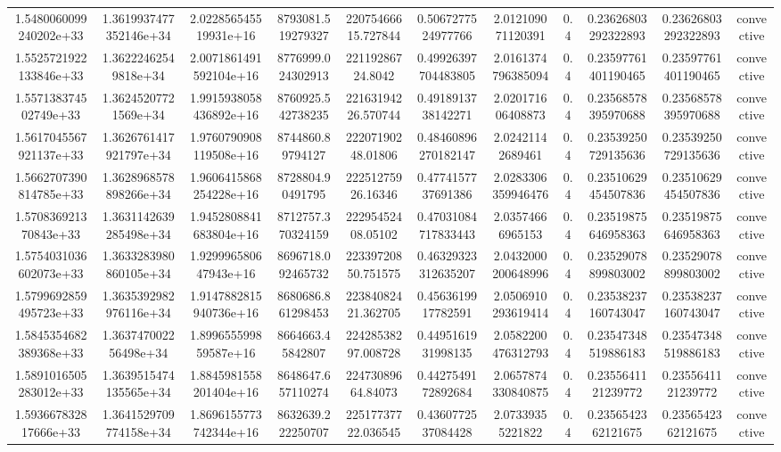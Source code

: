 \begin{table}
\begin{tabular}{ccccccccccc}
1.5480060099240202e+33 & 1.3619937477352146e+34 & 2.022856545519931e+16 & 8793081.519279327 & 22075466615.727844 & 0.5067277524977766 & 2.012109071120391 & 0.4 & 0.23626803292322893 & 0.23626803292322893 & convective \\
1.5525721922133846e+33 & 1.36222462549818e+34 & 2.0071861491592104e+16 & 8776999.024302913 & 22119286724.8042 & 0.49926397704483805 & 2.0161374796385094 & 0.4 & 0.23597761401190465 & 0.23597761401190465 & convective \\
1.557138374502749e+33 & 1.36245207721569e+34 & 1.9915938058436892e+16 & 8760925.542738235 & 22163194226.570744 & 0.4918913738142271 & 2.020171606408873 & 0.4 & 0.23568578395970688 & 0.23568578395970688 & convective \\
1.5617045567921137e+33 & 1.3626761417921797e+34 & 1.9760790908119508e+16 & 8744860.89794127 & 22207190248.01806 & 0.48460896270182147 & 2.02421142689461 & 0.4 & 0.23539250729135636 & 0.23539250729135636 & convective \\
1.5662707390814785e+33 & 1.3628968578898266e+34 & 1.9606415868254228e+16 & 8728804.90491795 & 22251275926.16346 & 0.4774157737691386 & 2.0283306359946476 & 0.4 & 0.23510629454507836 & 0.23510629454507836 & convective \\
1.570836921370843e+33 & 1.3631142639285498e+34 & 1.9452808841683804e+16 & 8712757.370324159 & 22295452408.05102 & 0.47031084717833443 & 2.03574666965153 & 0.4 & 0.23519875646958363 & 0.23519875646958363 & convective \\
1.5754031036602073e+33 & 1.3633283980860105e+34 & 1.929996580647943e+16 & 8696718.092465732 & 22339720850.751575 & 0.46329323312635207 & 2.0432000200648996 & 0.4 & 0.23529078899803002 & 0.23529078899803002 & convective \\
1.5799692859495723e+33 & 1.3635392982976116e+34 & 1.9147882815940736e+16 & 8680686.861298453 & 22384082421.362705 & 0.4563619917782591 & 2.0506910293619414 & 0.4 & 0.23538237160743047 & 0.23538237160743047 & convective \\
1.5845354682389368e+33 & 1.363747002256498e+34 & 1.899655599859587e+16 & 8664663.45842807 & 22428538297.008728 & 0.4495161931998135 & 2.0582200476312793 & 0.4 & 0.23547348519886183 & 0.23547348519886183 & convective \\
1.5891016505283012e+33 & 1.3639515474135565e+34 & 1.8845981558201404e+16 & 8648647.657110274 & 22473089664.84073 & 0.4427549172892684 & 2.0657874330840875 & 0.4 & 0.2355641121239772 & 0.2355641121239772 & convective \\
1.593667832817666e+33 & 1.3641529709774158e+34 & 1.8696155773742344e+16 & 8632639.222250707 & 22517737722.036545 & 0.4360772537084428 & 2.07339355221822 & 0.4 & 0.2356542362121675 & 0.2356542362121675 & convective \\

\end{tabular}
\end{table}
